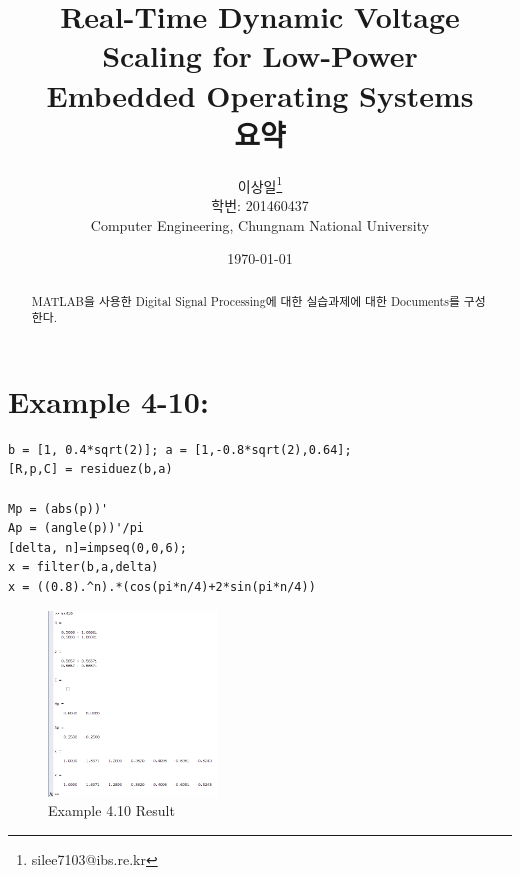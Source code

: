 \documentclass[11pt
  , a4paper
  , article
  , oneside
]{memoir}
\begin{document}
\newcommand{\technumber}{
  Low-Power Real-Time Scheduling\\
  Document 1: 2016-06-02}
\title{\textbf{Real-Time Dynamic Voltage Scaling for Low-Power \\
		Embedded Operating Systems \\
		요약 \\}}

\author{이상일\thanks{silee7103@ibs.re.kr} \\

  학번: 201460437\\
  Computer Engineering, Chungnam National University 
}
\date{\today}

\renewcommand{\maketitlehooka}{\begin{flushright}\textsf{\technumber}\end{flushright}}

\maketitle

\begin{abstract}
MATLAB을 사용한 Digital Signal Processing에 대한 실습과제에 대한 Documents를 구성한다.
\end{abstract}

\chapter{Example 4-10:}

\begin{lstlisting}[style=termstyle]
%Example 4-10
b = [1, 0.4*sqrt(2)]; a = [1,-0.8*sqrt(2),0.64];
[R,p,C] = residuez(b,a)

Mp = (abs(p))'
Ap = (angle(p))'/pi
[delta, n]=impseq(0,0,6);
x = filter(b,a,delta)
x = ((0.8).^n).*(cos(pi*n/4)+2*sin(pi*n/4))\end{lstlisting}

\begin{figure}[h!]
	\centering
	\includegraphics[width=0.4\textwidth,height=0.15\textwidth]{./images/ex410.png}
	\caption{Example 4.10 Result}
	\label{fig:Example 4.10 Result}
\end{figure}
\end{document}
